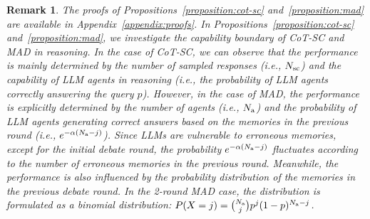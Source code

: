 \documentclass{article} %
\theoremstyle{plain}
\newtheorem{remark}{Remark}
\begin{document}
\begin{remark}
The proofs of Propositions~\ref{proposition:cot-sc} and~\ref{proposition:mad} are available in Appendix~\ref{appendix:proofs}. In Propositions~\ref{proposition:cot-sc} and~\ref{proposition:mad}, we investigate the capability boundary of CoT-SC and MAD in reasoning. 
In the case of CoT-SC, we can observe that the performance is mainly determined by the number of sampled responses (i.e., $N_{\rm sc}$) and the capability of LLM agents in reasoning (i.e., the probability of LLM agents correctly answering the query $p$). However, in the case of MAD, the performance is explicitly determined by the number of agents (i.e., $N_{\rm a}$) and the probability of LLM agents generating correct answers based on the memories in the previous round (i.e., $e^{-\alpha (N_{\rm a}-j)}$). Since LLMs are vulnerable to erroneous memories, except for the initial debate round, the probability $e^{-\alpha (N_{\rm a}-j)}$ fluctuates according to the number of erroneous memories in the previous round. Meanwhile, the performance is also influenced by the probability distribution of the memories in the previous debate round. In the 2-round MAD case, the distribution is formulated as a binomial distribution: $P(X=j)=\binom{N_{\rm a}}{j}p^j(1-p)^{N_{\rm a}-j}$.%
\end{remark}
\vspace{-7pt}
\end{document}
